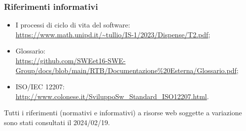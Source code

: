         \subsubsection{Riferimenti informativi}

\begin{itemize}
\item I processi di ciclo di vita del software: \\ \url{https://www.math.unipd.it/~tullio/IS-1/2023/Dispense/T2.pdf};
\item Glossario: \\ \url{https://github.com/SWEet16-SWE-Group/docs/blob/main/RTB/Documentazione%20Esterna/Glossario.pdf};
\item ISO/IEC 12207: \\ \url{http://www.colonese.it/SviluppoSw_Standard_ISO12207.html}.
\end{itemize}

        Tutti i riferimenti (normativi e informativi) a risorse web soggette a variazione sono stati consultati il 2024/02/19.
